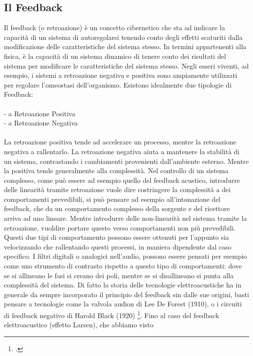 \subsection{Il Feedback}
\label{sec:Il Feedback}
Il feedback (o retroazione) è un concetto cibernetico che sta ad indicare
la capacità di un sistema di autoregolarsi tenendo conto degli effetti scaturiti
dalla modificazione delle caratteristiche del sistema stesso.
In termini appartenenti alla fisica, è la capacità di un sistema dinamico
di tenere conto dei risultati del sistema per
modificare le caratteristiche del sistema stesso.
Negli esseri viventi, ad esempio, i sistemi a retroazione negativa e positiva
sono ampiamente utilizzati per regolare l'omeostasi dell'organismo.
Esistono idealmente due tipologie di Feedback:
\\ \\
- a Retroazione Positiva
\\
- a Retroazione Negativa
\\ \\
La retroazione positiva tende ad accelerare un processo,
mentre la retroazione negativa a rallentarlo.
La retroazione negativa aiuta a mantenere la stabilità di un sistema,
contrastando i cambiamenti provenienti dall'ambiente esterno.
Mentre la positiva tende generalmente alla complessità.
Nel controllo di un sistema complesso,
come può essere ad esempio quello del feedback acustico,
introdurre delle linearità tramite retroazione
vuole dire costringere la complessità
a dei comportamenti prevedibili, si può pensare ad esempio
all'intonazione del feedback,
che da un comportamento complesso della sorgente e del ricettore arriva
ad uno lineare.
Mentre introdurre delle non-linearità nel sistema tramite la retroazione,
vuoldire portare questo verso comportamenti non più prevedibili.
Questi due tipi di comportamento possono essere ottenuti per l'appunto
sia velocizzando che rallentando questi processi,
in maniera dipendente dal caso specifico.
I filtri digitali o analogici nell'audio,
possono essere pensati per esempio come uno strumento
di contrasto rispetto a questo tipo di comportamenti:
dove se si allineano le fasi si creano dei poli,
mentre se si disallineano si punta alla complessità del sistema.
Di fatto la storia delle tecnologie elettroacustiche ha in generale
da sempre incorporato il principio
del feedback sin dalle sue origini, basti pensare a tecnologie
come la valvola audion di Lee De Forest (1910),
o i circuiti di feedback negativo di Harold Black (1920) \footcite{echodiscipio}.
Fino al caso del feedback elettroacustico (effetto Larsen), che abbiamo visto
